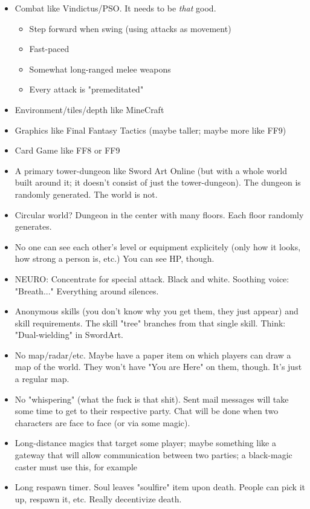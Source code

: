 \documentclass{article}
\begin{document}
\begin{itemize}
    \item Combat like Vindictus/PSO. It needs to be \textit{that} good.
        \begin{itemize}
            \item Step forward when swing (using attacks as movement)
            \item Fast-paced
            \item Somewhat long-ranged melee weapons
            \item Every attack is "premeditated"
        \end{itemize}
    \item Environment/tiles/depth like MineCraft
    \item Graphics like Final Fantasy Tactics (maybe taller; maybe more like FF9)
    \item Card Game like FF8 or FF9
    \item A primary tower-dungeon like Sword Art Online (but with a 
        whole world built around it; it doesn't consist of just the
        tower-dungeon). The dungeon is randomly generated. The world
        is not.
    \item Circular world? Dungeon in the center with many floors.
        Each floor randomly generates.
    \item No one can see each other's level or equipment
        explicitely (only how it looks, how strong a person is, etc.)
        You can see HP, though.
    \item NEURO: Concentrate for special attack. Black and white.  
        Soothing voice: "Breath..." Everything around silences.
    \item Anonymous skills (you don't know why you get them, they 
        just appear) and skill requirements. The skill "tree"
        branches from that single skill. Think: "Dual-wielding" in 
        SwordArt.
    \item No map/radar/etc. Maybe have a paper item on which players
        can draw a map of the world. They won't have "You are Here"
        on them, though. It's just a regular map. 
    \item No "whispering" (what the fuck is that shit). Sent mail
        messages will take some time to get to their respective party.
        Chat will be done when two characters are face to face (or
        via some magic).
    \item Long-distance magics that target some player; maybe
        something like a gateway that will allow communication 
        between two parties; a black-magic caster must use this,
        for example
    \item Long respawn timer. Soul leaves "soulfire" item upon death. 
        People can pick it up, respawn it, etc. Really decentivize 
        death.


\end{itemize}
\end{document}
